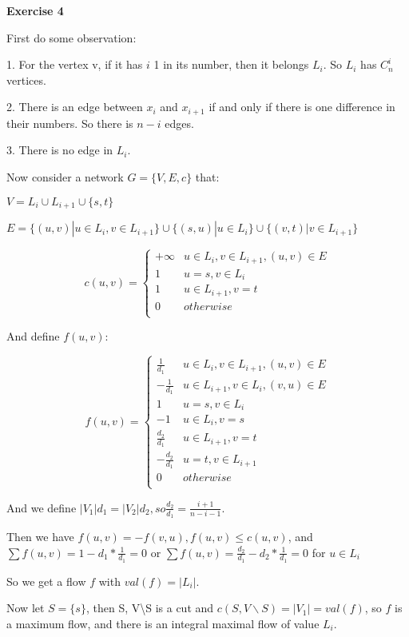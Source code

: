 \documentclass{article}
\begin{document}
\textbf{Exercise 4}

First do some observation:

1. For the vertex v, if it has $i$ 1 in its number, then it belongs $L_i$. So $L_i$ has $C_{n}^{i}$ vertices.

2. There is an edge between $x_i$ and $x_{i+1}$ if and only if there is one difference in their numbers. So there is $n-i$ edges.

3. There is no edge in $L_{i}$.

Now consider a network $G = \{ V, E, c \}$ that:

$V = L_{i} \cup L_{i+1} \cup \{s, t\}$

$E = \{  (u,v) | u \in L_{i}, v \in L_{i+1} \} \cup \{(s,u) | u \in L_{i} \} \cup \{(v,t) | v \in L_{i+1} \}$

$$c(u, v)=
\begin{cases}
+\infty & u\in L_{i}, v \in  L_{i+1}, (u,v) \in E\\
1& u=s, v \in  L_{i}\\
1& u \in  L_{i+1} , v=t   \\
0& otherwise\\
\end{cases}$$

And define $f(u,v)$:

$$f(u, v)=
\begin{cases}
\frac{1}{d_1} & u\in L_{i}, v \in L_{i+1}, (u,v) \in E\\
-\frac{1}{d_1} & u\in L_{i+1}, v \in L_{i}, (v,u) \in E\\
1 & u=s, v \in L_{i}\\
-1 & u\in L_{i}, v = s\\
\frac{d_2}{d_1} & u\in L_{i+1}, v = t\\
-\frac{d_2}{d_1} & u=t, v\in L_{i+1}\\
0 & otherwise\\
\end{cases}$$

And we define $|V_1|d_1 = |V_2|d_2, so \frac{d_2}{d_1} = \frac{i+1}{n-i-1}$.

Then we have $f(u,v) = - f(v,u), f(u,v) \leqslant c(u,v)$, and $\sum f(u,v) = 1- d_1 * \frac{1}{d_1} = 0$ or $\sum f(u,v) = \frac{d_2}{d_1} - d_2 *\frac{1}{d_1} = 0$ for $u\in L_{i}$

So we get a flow $f$ with $val(f) = |L_{i}|$.

Now let $S = \{ s\}$, then S, V\backslash S is a cut and $c(S,V\backslash S) = |V_1| = val(f)$, so $f$ is a maximum flow, and there is an integral maximal flow of value $L_{i}$. 
\end{document}
